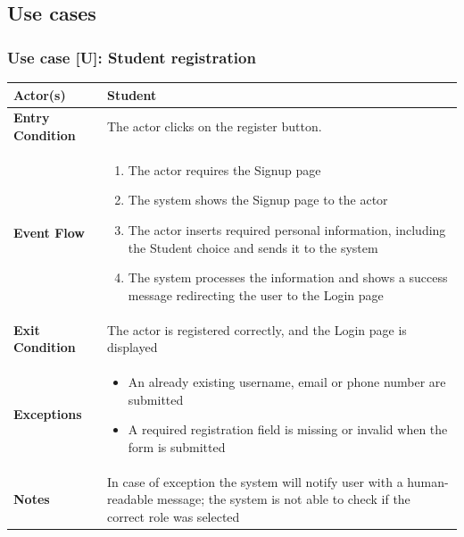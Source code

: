 \documentclass[12pt, a4paper]{report}
\newcounter{useCase}
\newcommand{\usecase}[9]{
    \def\arraystretch{1.5} 
    \subsubsection*{Use case [U#2]: #3}
    \vspace*{0.2cm}
    \begin{center}
        \begin{tabular}{|l|p{12cm}|}
            \hline
            \textbf{Actor(s)} & #4 \\
            \hline
            \textbf{Entry Condition} & #5 \\
            \hline
            \textbf{Event Flow} & #6 \\
            \hline
            \textbf{Exit Condition} & #7 \\
            \hline
            \textbf{Exceptions} & #8 \\
            \hline
            \textbf{Notes} & #9 \\
            \hline
        \end{tabular}
    \end{center}
    #1
}
\begin{document}
        \subsection{Use cases}
        \usecase{}
        {}
        {Student registration}
        {Student}
        {The actor clicks on the register button.}
        {
        \begin{enumerate}
            \item The actor requires the Signup page
            \item The system shows the Signup page to the actor
            \item The actor inserts required personal information, including the Student choice and sends it to the system
            \item The system processes the information and shows a success message redirecting the user to the Login page
        \end{enumerate}
        }
        {The actor is registered correctly, and the Login page is displayed}
        {
        \begin{itemize}
            \item An already existing username, email or phone number are submitted
            \item A required registration field is missing or invalid when the form is submitted
        \end{itemize}
        }
        {In case of exception the system will notify user with a human-readable message; the system is not able to check if the correct role was selected}
\end{document}
